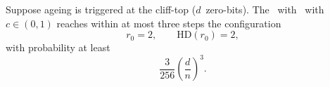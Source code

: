 \begin{lemma}
	Suppose ageing is triggered at the cliff-top ($d$~zero-bits).  
	The \lastBest~with \linHD\ with $c\in(0,1)$ reaches within at most three steps the 
	configuration
	\[
	r_0=2, \qquad \mathrm{HD}(r_0)=2,
	\]
	with probability at least 
	\[
	\frac{3}{256}\left(\frac{d}{n}\right)^3.
	\]
\end{lemma}
%	
%	
%	
%	
